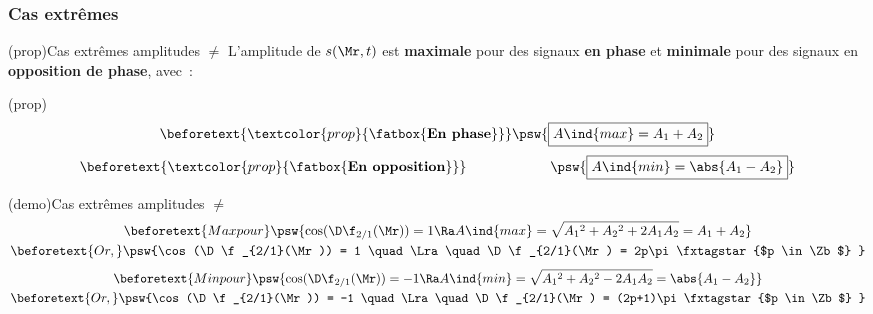 \documentclass[../../main/main.tex]{subfiles}
\begin{document}

\subsubsection{Cas extrêmes}
\begin{tcb*}(prop){Cas extrêmes amplitudes $\neq$}
	L'amplitude de $s(\Mr,t)$ est \textbf{maximale} pour des signaux \textbf{en
		phase} et \textbf{minimale} pour des signaux en \textbf{opposition de phase},
	avec~:
	\smallbreak
	\begin{isd}(prop)
		\vspace{-15pt}
		\begin{gather*}
			\beforetext{\textcolor{prop}{\fatbox{\textbf{En phase}}}}
			\psw{\boxed{A\ind{max} = A_1+A_2}}
		\end{gather*}
		\vspace{-15pt}
		\tcblower
		\vspace{-15pt}
		\begin{gather*}
			\beforetext{\textcolor{prop}{\fatbox{\textbf{En opposition}}}}
			\hspace{60pt}
			\psw{\boxed{A\ind{min} = \abs{A_1-A_2}}}
		\end{gather*}
		\vspace{-15pt}
	\end{isd}
\end{tcb*}

\begin{tcb*}[breakable](demo){Cas extrêmes amplitudes $\neq$}
	\vspace{-15pt}
	\begin{gather*}
		\beforetext{Max pour}
		\psw{%
		\cos (\D\f_{2/1}(\Mr)) = 1
		\Ra
		A\ind{max} = \sqrt{A_1{}^2 + A_2{}^2 + 2A_1A_2} = A_1+A_2
		}%
		\\\beforetext{Or,}
		\psw{%
			\cos (\D\f_{2/1}(\Mr)) = 1
			\quad \Lra \quad
			\D\f_{2/1}(\Mr) = 2p\pi
			\tag*{$p \in \Zb$}
		}%
	\end{gather*}
	\tcblower
	\vspace{-15pt}
	\begin{gather*}
		\beforetext{Min pour}
		\psw{%
		\cos (\D\f_{2/1}(\Mr)) = -1
		\Ra
		A\ind{min} = \sqrt{A_1{}^2 + A_2{}^2 - 2A_1A_2} = \abs{A_1-A_2}
		}%
		\\\beforetext{Or,}
		\psw{%
			\cos (\D\f_{2/1}(\Mr)) = -1
			\quad \Lra \quad
			\D\f_{2/1}(\Mr) = (2p+1)\pi
			\tag*{$p \in \Zb$}
		}%
	\end{gather*}
\end{tcb*}
\end{document}
